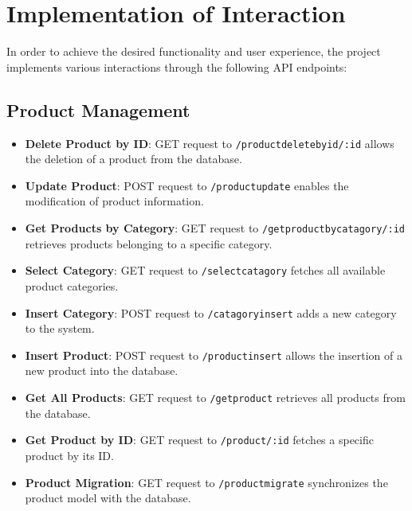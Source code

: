 \section{Implementation of Interaction}
In order to achieve the desired functionality and user experience, the project implements various interactions through the following API endpoints:

\subsection*{Product Management}
\begin{itemize}
\item \textbf{Delete Product by ID}: GET request to \texttt{/productdeletebyid/:id} allows the deletion of a product from the database.
\item \textbf{Update Product}: POST request to \texttt{/productupdate} enables the modification of product information.
\item \textbf{Get Products by Category}: GET request to \texttt{/getproductbycatagory/:id} retrieves products belonging to a specific category.
\item \textbf{Select Category}: GET request to \texttt{/selectcatagory} fetches all available product categories.
\item \textbf{Insert Category}: POST request to \texttt{/catagoryinsert} adds a new category to the system.
\item \textbf{Insert Product}: POST request to \texttt{/productinsert} allows the insertion of a new product into the database.
\item \textbf{Get All Products}: GET request to \texttt{/getproduct} retrieves all products from the database.
\item \textbf{Get Product by ID}: GET request to \texttt{/product/:id} fetches a specific product by its ID.
\item \textbf{Product Migration}: GET request to \texttt{/productmigrate} synchronizes the product model with the database.
\end{itemize}

